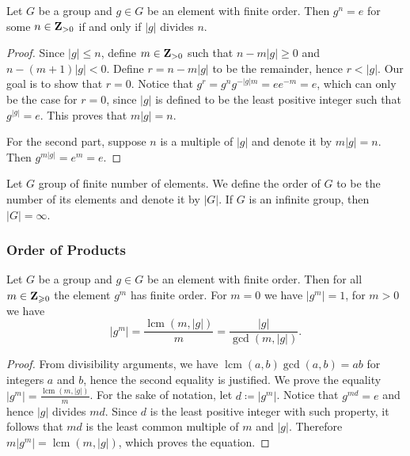\begin{lemma}\label{lem: order and multiples}
Let \(G\) be a group and \(g \in G\) be an element with finite order. Then
\(g^n = e\) for some \(n \in \mathbf{Z}_{> 0}\) if and only if \(|g|\) divides
\(n\).
\end{lemma}

\begin{proof}
Since \(|g| \leq n\), define \(m \in \mathbf{Z}_{> 0}\) such that \(n - m |g|
\geq 0\) and \(n - (m + 1) |g| < 0\). Define \(r = n - m |g|\) to be the
remainder, hence \(r < |g|\). Our goal is to show that \(r = 0\). Notice that
\(g^r = g^n g^{-|g| m} = e e^{-m} = e\), which can only be the case for \(r =
0\), since \(|g|\) is defined to be the least positive integer such that
\(g^{|g|} = e\). This proves that \(m |g| = n\).

For the second part, suppose \(n\) is a multiple of \(|g|\) and denote it by
\(m|g| = n\). Then \(g^{m |g|} = e^m = e\).
\end{proof}

\begin{definition}
Let \(G\) group of finite number of elements. We define the order of \(G\) to
be the number of its elements and denote it by \(|G|\). If \(G\) is an
infinite group, then \(|G| = \infty\).
\end{definition}

\subsubsection{Order of Products}

\begin{proposition}\label{prop: order of the power}
Let \(G\) be a group and \(g \in G\) be an element with finite order. Then for
all \(m \in \mathbf{Z}_{\geqslant 0}\) the element \(g^m\) has finite order. For
\(m = 0\) we have \(|g^m| = 1\), for \(m > 0\) we have
\[
  |g^m| = \frac{\operatorname{lcm}(m, |g|)}{m} =
  \frac{|g|}{\operatorname{gcd}(m, |g|)}.
\]
\end{proposition}

\begin{proof}
From divisibility arguments, we have \(\operatorname{lcm}(a, b)
\operatorname{gcd}(a, b) = ab\) for integers \(a\) and \(b\), hence the second
equality is justified. We prove the equality \(|g^m| =
\frac{\operatorname{lcm}(m, |g|)} m\). For the sake of notation, let \(d \coloneq
|g^m|\). Notice that \(g^{m d} = e\) and hence \(|g|\) divides \(m d\). Since
\(d\) is the least positive integer with such property, it follows that \(m
d\) is the least common multiple of \(m\) and \(|g|\). Therefore \(m |g^m| =
\operatorname{lcm}(m, |g|)\), which proves the equation.
\end{proof}

